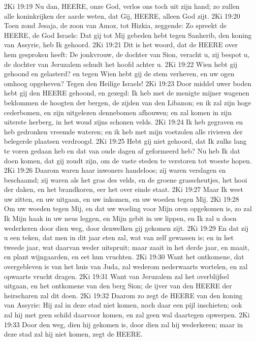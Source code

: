 2Ki 19:19  Nu dan, HEERE, onze God, verlos ons toch uit zijn hand; zo zullen alle koninkrijken der aarde weten, dat Gij, HEERE, alleen God zijt.
2Ki 19:20  Toen zond Jesaja, de zoon van Amoz, tot Hizkia, zeggende: Zo spreekt de HEERE, de God Israels: Dat gij tot Mij gebeden hebt tegen Sanherib, den koning van Assyrie, heb Ik gehoord.
2Ki 19:21  Dit is het woord, dat de HEERE over hem gesproken heeft: De jonkvrouw, de dochter van Sion, veracht u, zij bespot u, de dochter van Jeruzalem schudt het hoofd achter u.
2Ki 19:22  Wien hebt gij gehoond en gelasterd? en tegen Wien hebt gij de stem verheven, en uw ogen omhoog opgeheven? Tegen den Heilige Israels!
2Ki 19:23  Door middel uwer boden hebt gij den HEERE gehoond, en gezegd: Ik heb met de menigte mijner wagenen beklommen de hoogten der bergen, de zijden van den Libanon; en ik zal zijn hoge cederbomen, en zijn uitgelezen dennebomen afhouwen; en zal komen in zijn uiterste herberg, in het woud zijns schonen velds.
2Ki 19:24  Ik heb gegraven en heb gedronken vreemde wateren; en ik heb met mijn voetzolen alle rivieren der belegerde plaatsen verdroogd.
2Ki 19:25  Hebt gij niet gehoord, dat Ik zulks lang te voren gedaan heb en dat van oude dagen af geformeerd heb? Nu heb Ik dat doen komen, dat gij zoudt zijn, om de vaste steden te verstoren tot woeste hopen.
2Ki 19:26  Daarom waren haar inwoners handeloos; zij waren verslagen en beschaamd; zij waren als het gras des velds, en de groene grasscheutjes, het hooi der daken, en het brandkoren, eer het over einde staat.
2Ki 19:27  Maar Ik weet uw zitten, en uw uitgaan, en uw inkomen, en uw woeden tegen Mij.
2Ki 19:28  Om uw woeden tegen Mij, en dat uw woeling voor Mijn oren opgekomen is, zo zal Ik Mijn haak in uw neus leggen, en Mijn gebit in uw lippen, en Ik zal u doen wederkeren door dien weg, door denwelken gij gekomen zijt.
2Ki 19:29  En dat zij u een teken, dat men in dit jaar eten zal, wat van zelf gewassen is; en in het tweede jaar, wat daarvan weder uitspruit; maar zaait in het derde jaar, en maait, en plant wijngaarden, en eet hun vruchten.
2Ki 19:30  Want het ontkomene, dat overgebleven is van het huis van Juda, zal wederom nederwaarts wortelen, en zal opwaarts vrucht dragen.
2Ki 19:31  Want van Jeruzalem zal het overblijfsel uitgaan, en het ontkomene van den berg Sion; de ijver van den HEERE der heirscharen zal dit doen.
2Ki 19:32  Daarom zo zegt de HEERE van den koning van Assyrie: Hij zal in deze stad niet komen, noch daar een pijl inschieten; ook zal hij met geen schild daarvoor komen, en zal geen wal daartegen opwerpen.
2Ki 19:33  Door den weg, dien hij gekomen is, door dien zal hij wederkeren; maar in deze stad zal hij niet komen, zegt de HEERE.
